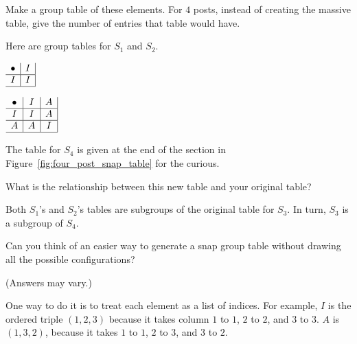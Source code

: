 \documentclass[../gatm_answers.tex]{subfiles}
\begin{document}
\begin{inner_problem}
	\item Make a group table of these elements. For $4$ posts, instead of creating the massive table, give the number of entries that table would have.
\end{inner_problem}

Here are group tables for $S_1$ and $S_2$.

\begin{minipage}{0.45\textwidth}
\centering
$\begin{array}{c|c|}
\bullet & I \\ \hline
I & I \\ \hline
\end{array}$
\end{minipage}\hfill
\begin{minipage}{0.45\textwidth}
\centering
$\begin{array}{c|c|c|}
\bullet & I & A \\ \hline
I & I & A \\ \hline
A & A & I \\ \hline
\end{array}$
\end{minipage}

The table for $S_4$ is given at the end of the section in Figure~\ref{fig:four_post_snap_table} for the curious.

\begin{inner_problem}
	\item What is the relationship between this new table and your original table?
\end{inner_problem}

Both $S_1$'s and $S_2$'s tables are subgroups of the original table for $S_3$. In turn, $S_3$ is a subgroup of $S_4$.

\begin{outer_problem}
	\item Can you think of an easier way to generate a snap group table without drawing all the possible configurations?
\end{outer_problem}

(Answers may vary.)

One way to do it is to treat each element as a list of indices. For example, $I$ is the ordered triple $(1,2,3)$ because it takes column $1$ to $1$, $2$ to $2$, and $3$ to $3$. $A$ is $(1,3,2)$, because it takes $1$ to $1$, $2$ to $3$, and $3$ to $2$.
\end{document}
